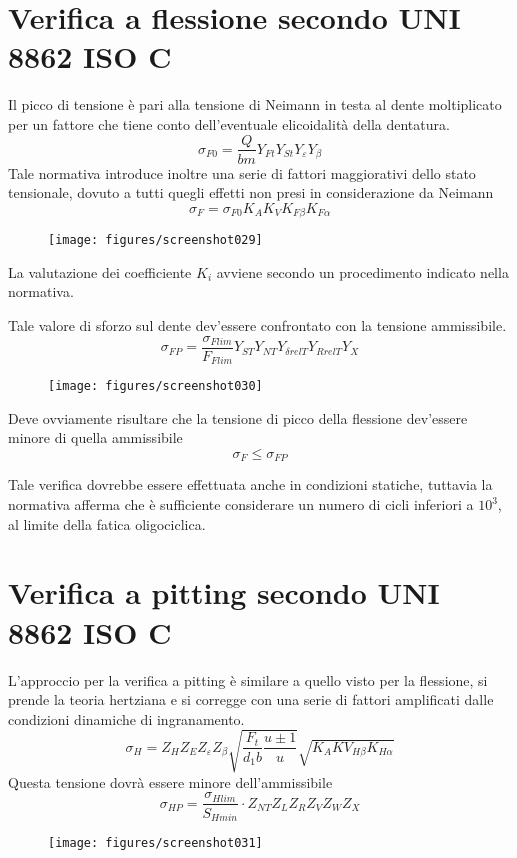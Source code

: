 \documentclass[a4paper, 15pt]{article}
\begin{document}
\section{Verifica a flessione secondo UNI 8862 ISO C}
\begin{adjustwidth}{2in}{}
	Il picco di tensione è pari alla tensione di Neimann in testa al dente moltiplicato per un fattore che tiene conto  dell'eventuale elicoidalità della dentatura. 
	\[\sigma_{F0} = \dfrac{Q}{bm}Y_{Ft}Y_{St}Y_\varepsilon Y_\beta\]
	Tale normativa introduce inoltre una serie di fattori maggiorativi dello stato tensionale, dovuto a tutti quegli effetti non presi in considerazione da Neimann 
	\[\sigma_{F} = \sigma_{F0}K_AK_VK_{F\beta}K_{F\alpha}\]
	\begin{figure}[H]
		\centering
		\texttt{[image: figures/screenshot029]}
		\label{fig:screenshot029}
	\end{figure}
	La valutazione dei coefficiente $K_i$ avviene secondo un procedimento indicato nella normativa. \newline 
	
	Tale valore di sforzo sul dente dev'essere confrontato con la tensione ammissibile.
	\[\sigma_{FP}=\dfrac{\sigma_{Flim}}{F_{Flim}}Y_{ST}Y_{NT}Y_{\delta relT}Y_{Rrel T}Y_X\]
	\begin{figure}[H]
		\centering
		\texttt{[image: figures/screenshot030]}
		\label{fig:screenshot030}
	\end{figure}	
	Deve ovviamente risultare che la tensione di picco della flessione dev'essere minore di quella ammissibile
	\[\sigma_{F}\leq\sigma_{FP}\]
	
	Tale verifica dovrebbe essere effettuata anche in condizioni statiche, tuttavia la normativa afferma che è sufficiente considerare un numero di cicli inferiori a $10^3$, al limite della fatica oligociclica. 
\end{adjustwidth}
\newpage
\section{Verifica a pitting secondo UNI 8862 ISO C}
\begin{adjustwidth}{2in}{}	
	L'approccio per la verifica a pitting è similare a quello  visto per la flessione, si prende la teoria hertziana e si corregge con una serie di fattori amplificati dalle condizioni dinamiche di ingranamento. 
	\[\sigma_H = Z_HZ_EZ_\varepsilon Z_\beta\sqrt{\dfrac{F_t}{d_1b}\dfrac{u\pm1}{u}}\sqrt{K_AKV_{H\beta}K_{H\alpha}}\]
	Questa tensione dovrà essere minore dell'ammissibile
	\[\sigma_{HP} = \dfrac{\sigma_{Hlim}}{S_{Hmin}} \cdot Z_{NT}Z_LZ_RZ_VZ_WZ_X\]
	\begin{figure}[H]
		\centering
		\texttt{[image: figures/screenshot031]}
		\label{fig:screenshot031}
	\end{figure}	
\end{adjustwidth}
\newpage
\end{document}
